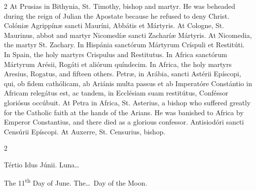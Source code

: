 \begin{paracol}{2}
At Prusias in Bithynia, St. Timothy, 
 bishop and martyr. He was beheaded during the reign of Julian the 
 Apostate because he refused to deny Christ.
\switchcolumn*
{}
Colóniæ Agrippínæ 
 sancti Mauríni, Abbátis et Mártyris.
\switchcolumn
{}
At Cologne, St. Maurinus, abbot and martyr
\switchcolumn*
{}
Nicomedíæ sancti 
 Zacharíæ Mártyris.
\switchcolumn
{}
At Nicomedia, the martyr St. 
 Zachary.
\switchcolumn*
{}
In Hispánia sanctórum 
 Mártyrum Críspuli et Restitúti.
\switchcolumn
{}
In Spain, the holy martyrs Crispulus 
 and Restitutus.
\switchcolumn*
{}
In Africa sanctórum 
 Mártyrum Arésii, Rogáti et aliórum quíndecim.
\switchcolumn
{}
In Africa, the holy martyrs Aresius, 
 Rogatus, and fifteen others.
\switchcolumn*
{}
Petræ, in Arábia, 
 sancti Astérii Epíscopi, qui, ob fidem cathólicam, ab Ariánis multa passus 
 et ab Imperatóre Constántio in Africam relegátus est, ac tandem, in 
 Ecclésiam suam restitútus, Conféssor gloriósus occúbuit.
\switchcolumn
{}
At Petra in Africa, St. Asterius, a 
 bishop who suffered greatly for the Catholic faith at the hands of the 
 Arians. He was banished to Africa by Emperor Constantius, and there 
 died as a glorious confessor.
\switchcolumn*
{}
Antisiodóri sancti 
 Censúrii Epíscopi.
\switchcolumn
{}
At Auxerre, St. Censurius, bishop.
\switchcolumn*
{}
\end{paracol}


\begin{paracol}{2}
\begin{center}{\color{gregoriocolor} Tértio Idus Júnii. 
 Luna\dots\ }\end{center}
\switchcolumn
{}
\begin{center}{\color{gregoriocolor} The 11\textsuperscript{th} Day of 
 June. The\dots\ Day of the Moon.}\end{center}
\end{paracol}

